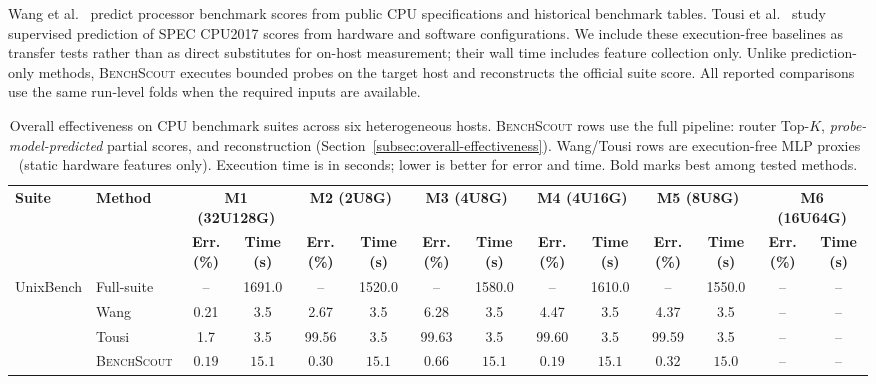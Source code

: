 \documentclass[sigplan,10pt]{acmart}
\newcommand{\ourmethod}{\textsc{BenchScout}\xspace}
\begin{document}
Wang et al.~\cite{wang2019predicting} predict processor benchmark scores from public CPU specifications and historical benchmark tables. Tousi et al.~\cite{tousi2022comparative} study supervised prediction of SPEC CPU2017 scores from hardware and software configurations.  We include these execution-free baselines as transfer tests rather than as direct substitutes for on-host measurement; their wall time includes feature collection only.  Unlike prediction-only methods, \ourmethod{} executes bounded probes on the target host and reconstructs the official suite score.  All reported comparisons use the same run-level folds when the required inputs are available.
\begin{table}[t]
\centering
\caption{Overall effectiveness on CPU benchmark suites across six heterogeneous hosts.
\ourmethod{} rows use the full pipeline: router Top-$K$, \emph{probe-model-predicted} partial scores, and reconstruction (Section~\ref{subsec:overall-effectiveness}).
Wang/Tousi rows are execution-free MLP proxies~\cite{wang2019predicting,tousi2022comparative} (static hardware features only).
Execution time is in seconds; lower is better for error and time. Bold marks best among tested methods.}
\label{tab:overall-effectiveness-cpu}
\footnotesize
\setlength{\tabcolsep}{3.2pt}
\begin{tabular}{llcccccccccccc}
\toprule
\multirow{2}{*}{\textbf{Suite}} & \multirow{2}{*}{\textbf{Method}} & \multicolumn{2}{c}{\textbf{M1 (32U128G)}} & \multicolumn{2}{c}{\textbf{M2 (2U8G)}} & \multicolumn{2}{c}{\textbf{M3 (4U8G)}} & \multicolumn{2}{c}{\textbf{M4 (4U16G)}} & \multicolumn{2}{c}{\textbf{M5 (8U8G)}} & \multicolumn{2}{c}{\textbf{M6 (16U64G)}} \\
\cmidrule(lr){3-4} \cmidrule(lr){5-6} \cmidrule(lr){7-8} \cmidrule(lr){9-10} \cmidrule(lr){11-12} \cmidrule(lr){13-14}
& & \textbf{Err. (\%)} & \textbf{Time (s)} & \textbf{Err. (\%)} & \textbf{Time (s)} & \textbf{Err. (\%)} & \textbf{Time (s)} & \textbf{Err. (\%)} & \textbf{Time (s)} & \textbf{Err. (\%)} & \textbf{Time (s)} & \textbf{Err. (\%)} & \textbf{Time (s)} \\
\midrule

\multirow{4}{*}{UnixBench} 
& Full-suite & -- & 1691.0 & -- & 1520.0 & -- & 1580.0 & -- & 1610.0 & -- & 1550.0 & -- & -- \\
& Wang~\cite{wang2019predicting} & 0.21 & 3.5 & 2.67 & 3.5 & 6.28 & 3.5 & 4.47 & 3.5 & 4.37 & 3.5 & -- & -- \\
& Tousi~\cite{tousi2022comparative} & 1.7 & 3.5 & 99.56 & 3.5 & 99.63 & 3.5 & 99.60 & 3.5 & 99.59 & 3.5 & -- & -- \\
& \ourmethod & $\mathbf{0.19}$ & $\mathbf{15.1}$ & $\mathbf{0.30}$ & $\mathbf{15.1}$ & $\mathbf{0.66}$ & $\mathbf{15.1}$ & $\mathbf{0.19}$ & $\mathbf{15.1}$ & $\mathbf{0.32}$ & $\mathbf{15.0}$ & -- & -- \\


\end{tabular}
\end{table}
\end{document}
